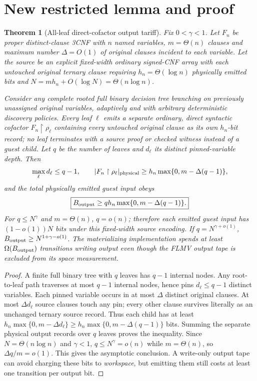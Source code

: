 \documentclass[11pt]{article}
\newtheorem{theorem}{Theorem}
\begin{document}
\section*{New restricted lemma and proof}
\begin{theorem}[All-leaf direct-cofactor output tariff]
Fix $0<\gamma<1$. Let $F_n$ be proper distinct-clause 3CNF with $n$ named variables, $m=\Theta(n)$ clauses and maximum number $\Delta=O(1)$ of original clauses incident to each variable. Let the source be an explicit fixed-width ordinary signed-CNF array with each untouched original ternary clause requiring $h_n=\Theta(\log n)$ physically emitted bits and $N=m h_n+O(\log N)=\Theta(n\log n)$.

Consider any complete rooted full binary decision tree branching on previously unassigned original variables, adaptively and with arbitrary deterministic discovery policies. Every leaf $\ell$ emits a separate ordinary, direct syntactic cofactor $F_n\upharpoonright\rho_\ell$ containing every untouched original clause as its own $h_n$-bit record; no leaf terminates with a source proof or checked witness instead of a guest child. Let $q$ be the number of leaves and $d_\ell$ its distinct pinned-variable depth. Then
\[
\max_\ell d_\ell\le q-1,\qquad
 |F_n\upharpoonright\rho_\ell|_{\rm physical}\ge h_n\max\{0,m-\Delta(q-1)\},
\]
and the total physically emitted guest input obeys
\[
\boxed{B_{\rm output}\ge qh_n\max\{0,m-\Delta(q-1)\}.}
\]
For $q\le N^\gamma$ and $m=\Theta(n)$, $q=o(n)$; therefore \emph{each} emitted guest input has $(1-o(1))N$ bits under this fixed-width source encoding. If $q=N^{\gamma+o(1)}$, $B_{\rm output}\ge N^{1+\gamma-o(1)}$. The materializing implementation spends at least $\Omega(B_{\rm output})$ transitions writing output even though the FLMV output tape is excluded from its \emph{space} measurement.
\end{theorem}
\begin{proof}
A finite full binary tree with $q$ leaves has $q-1$ internal nodes. Any root-to-leaf path traverses at most $q-1$ internal nodes, hence pins $d_\ell\le q-1$ distinct variables. Each pinned variable occurs in at most $\Delta$ distinct original clauses. At most $\Delta d_\ell$ source clauses touch any pin; every other clause survives literally as an unchanged ternary source record. Thus each child has at least $h_n\max\{0,m-\Delta d_\ell\}\ge h_n\max\{0,m-\Delta(q-1)\}$ bits. Summing the separate physical output records over $q$ leaves proves the inequality. Since $N=\Theta(n\log n)$ and $\gamma<1$, $q\le N^\gamma=o(n)$ while $m=\Theta(n)$, so $\Delta q/m=o(1)$. This gives the asymptotic conclusion. A write-only output tape can avoid charging these bits to \emph{workspace}, but emitting them still costs at least one transition per output bit. \qedhere
\end{proof}
\end{document}
